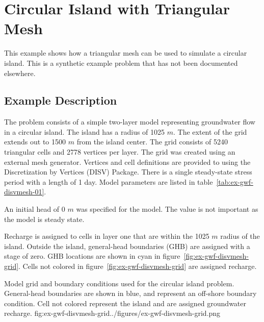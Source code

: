 \section{Circular Island with Triangular Mesh}

This example shows how a triangular mesh can be used to simulate a circular island.  This is a synthetic example problem that has not been documented elsewhere.

\subsection{Example Description}

The problem consists of a simple two-layer model representing groundwater flow in a circular island.  The island has a radius of 1025 $m$.  The extent of the grid extends out to 1500 $m$ from the island center.  The grid consists of 5240 triangular cells and 2778 vertices per layer.  The grid was created using an external mesh generator.  Vertices and cell definitions are provided to \mf using the Discretization by Vertices (DISV) Package.  There is a single steady-state stress period with a length of 1 day.   Model parameters are listed in table~\ref{tab:ex-gwf-disvmesh-01}. 



An initial head of 0 $m$ was specified for the model.  The value is not important as the model is steady state.

Recharge is assigned to cells in layer one that are within the 1025 $m$ radius of the island.  Outside the island, general-head boundaries (GHB) are assigned with a stage of zero.  GHB locations are shown in cyan in figure~\ref{fig:ex-gwf-disvmesh-grid}. Cells not colored in figure~\ref{fig:ex-gwf-disvmesh-grid} are assigned recharge.   

\begin{StandardFigure}{
                                     Model grid and boundary conditions used for the circular island problem.  General-head boundaries are shown in blue, and represent an off-shore boundary condition.  Cell not colored represent the island and are assigned groundwater recharge.
                                     }{fig:ex-gwf-disvmesh-grid}{../figures/ex-gwf-disvmesh-grid.png}
\end{StandardFigure}                                 

